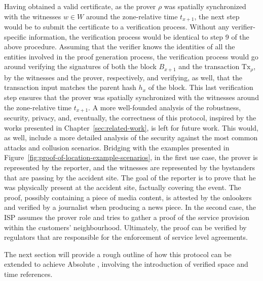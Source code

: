 Having obtained a valid \pol{} certificate, as the prover $\rho$ was spatially synchronized with the witnesses $w \in W$ around the zone-relative time $t_{x+1}$, the next step would be to submit the certificate to a verification process. Without any verifier-specific information, the verification process would be identical to step 9 of the above procedure. Assuming that the verifier knows the identities of all the entities involved in the proof generation process, the verification process would go around verifying the signatures of both the block $B_{x+1}$ and the transaction $\text{Tx}_\rho$, by the witnesses and the prover, respectively, and verifying, as well, that the transaction input matches the parent hash $h_{x}$ of the block. This last verification step ensures that the prover was spatially synchronized with the witnesses around the zone-relative time $t_{x+1}$. A more well-founded analysis of the robustness, security, privacy, and, eventually, the correctness of this \pol{} protocol, inspired by the works presented in Chapter~\ref{sec:related-work}, is left for future work. This would, as well, include a more detailed analysis of the security against the most common attacks and collusion scenarios. Bridging with the examples presented in Figure~\ref{fig:proof-of-location-example-scenarios}, in the first use case, the prover is represented by the reporter, and the witnesses are represented by the bystanders that are passing by the accident site. The goal of the reporter is to prove that he was physically present at the accident site, factually covering the event. The proof, possibly containing a piece of media content, is attested by the onlookers and verified by a journalist when producing a news piece. In the second case, the ISP assumes the prover role and tries to gather a proof of the service provision within the customers' neighbourhood. Ultimately, the proof can be verified by regulators that are responsible for the enforcement of service level agreements. 

The next section will provide a rough outline of how this protocol can be extended to achieve Absolute \pol{}, involving the introduction of verified space and time references.